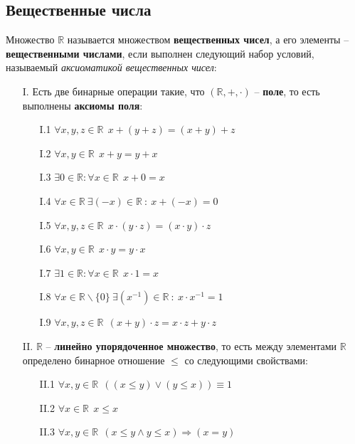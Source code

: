 \subsection{Вещественные числа}
\begin{definition}
    Множество $\mathbb{R}$ называется множеством \textbf{вещественных чисел}, а его элементы -- \textbf{вещественными числами}, если выполнен следующий набор условий,
    называемый \textit{аксиоматикой вещественных чисел}:
\begin{itemize}
    \item[I.] Есть две бинарные операции такие, что $(\mathbb{R}, +, \cdot)$ -- \textbf{поле}, то есть выполнены \textbf{аксиомы поля}:
    \begin{itemize}
        \item[I.1] $\forall x,y,z \in \mathbb{R} \ \ x + (y + z) = (x + y) + z$
        \item[I.2] $\forall x,y \in \mathbb{R} \ \ x + y = y + x$
        \item[I.3] $\exists 0 \in \mathbb{R} : \forall x \in \mathbb{R} \ \ x + 0 = x$
        \item[I.4] $\forall x \in \mathbb{R} \ \exists (-x) \in \mathbb{R} \ : \ x + (-x) = 0$
        \item[I.5] $\forall x,y,z \in \mathbb{R} \ \ x \cdot (y \cdot z) = (x \cdot y) \cdot z$
        \item[I.6] $\forall x,y \in \mathbb{R} \ \ x \cdot y = y \cdot x$
        \item[I.7] $\exists 1 \in \mathbb{R} : \forall x \in \mathbb{R} \ \ x \cdot 1 = x$
        \item[I.8] $\forall x \in \mathbb{R} \backslash \{0\} \ \exists (x^{-1}) \in \mathbb{R} \ : \ x \cdot x^{-1} = 1$
        \item[I.9] $\forall x,y,z \in \mathbb{R} \ \ (x + y) \cdot z = x \cdot z + y \cdot z $
    \end{itemize}
    \item[II.] $\mathbb{R}$ -- \textbf{линейно упорядоченное множество}, то есть между элементами $\mathbb{R}$ определено бинарное отношение $\leq$ со следующими свойствами:
    \begin{itemize}
        \item[II.1] $\forall x,y \in \mathbb{R} \ \ ((x \leq y) \vee (y \leq x)) \equiv 1$
        \item[II.2] $\forall x \in \mathbb{R} \ \ x \leq x$
        \item[II.3] $\forall x, y \in \mathbb{R} \ \ (x \leq y \wedge  y \leq x) \Rightarrow (x = y)$

\end{itemize}
\end{itemize}
\end{definition}
